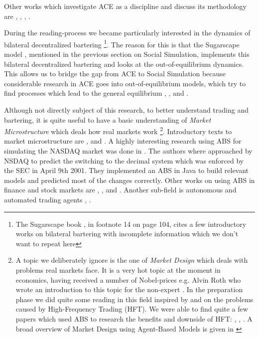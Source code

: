 Other works which investigate ACE as a discipline and discuss its methodology are \cite{tesfatsion_agent-based_2002}, \cite{richiardi_agent-based_2007}, \cite{ballot_agent-based_2015}, \cite{blume_introduction_2015}.

During the reading-process we became particularly interested in the dynamics of bilateral decentralized bartering \footnote{The Sugarscape book \cite{epstein_growing_1996}, in footnote 14 on page 104, cites a few introductory works on bilateral bartering with incomplete information which we don't want to repeat here}. The reason for this is that the Sugarscape model \cite{epstein_growing_1996}, mentioned in the previous section on Social Simulation, implements this bilateral decentralized bartering and looks at the out-of-equilibrium dynamics. This allows us to bridge the gap from ACE to Social Simulation because considerable research in ACE goes into out-of-equilibrium models, which try to find processes which lead to the general equilibrium \cite{gintis_emergence_2006}, \cite{gintis_dynamics_2007}, \cite{arthur_out--equilibrium_2006} and \cite{botta_functional_2011}.

Although not directly subject of this research, to better understand trading and bartering, it is quite useful to have a basic understanding of \textit{Market Microstructure} which deals how real markets work \footnote{A topic we deliberately ignore is the one of \textit{Market Design} which deals with problems real markets face. It is a very hot topic at the moment in economics, having received a number of Nobel-prices e.g. Alvin Roth who wrote an introduction to this topic for the non-expert \cite{roth_who_2015}. In the preparation phase we did quite some reading in this field inspired by \cite{sornette_crashes_2011} and \cite{budish_editors_2015} on the problems caused by High-Frequency Trading (HFT). We were able to find quite a few papers which used ABS to research the benefits and downside of HFT: \cite{wah_latency_2013}, \cite{leal_rock_2016}, \cite{yim_effect_2015}. A broad overview of Market Design using Agent-Based Models is given in \cite{marks_chapter_2006}}. Introductory texts to market microstructure are \cite{harris_trading_2003}, \cite{baker_market_2013} and \cite{lehalle_market_2013}. A highly interesting research using ABS for simulating the NASDAQ market was done in \cite{darley_nasdaq_2007}. The authors where approached by NSDAQ to predict the switching to the decimal system which was enforced by the SEC in April 9th 2001. They implemented an ABS in Java to build relevant models and predicted most of the changes correctly. Other works on using ABS in finance and stock markets are \cite{lebaron_agent-based_2000}, \cite{lebaron_building_2002}, \cite{streltchenko_multi-agent_2005} and \cite{panayi_agent-based_2012}. Another sub-field is autonomous and automated trading agents \cite{mackie-mason_chapter_2006}, \cite{toulis_mertacor:_2006}.

